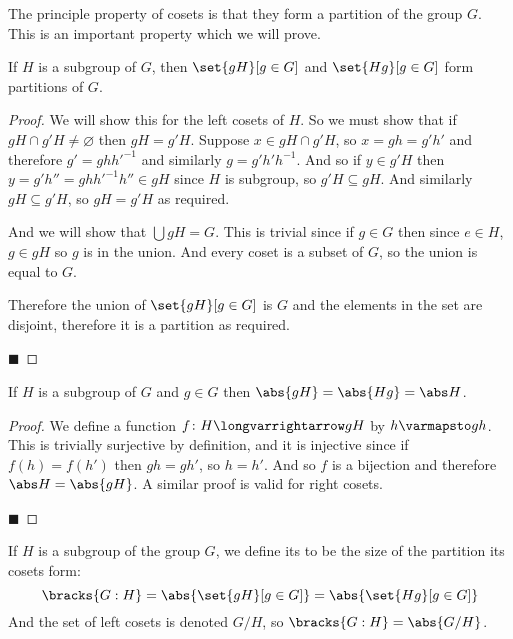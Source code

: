 The principle property of cosets is that they form a partition of the group $G$.
This is an important property which we will prove.

\begin{prop*}

    If $H$ is a subgroup of $G$, then $\set{gH}[g\in G]$ and $\set{Hg}[g\in G]$ form partitions of $G$.

\end{prop*}

\begin{proof}

    We will show this for the left cosets of $H$.
    So we must show that if $gH\cap g'H\neq\varnothing$ then $gH=g'H$.
    Suppose $x\in gH\cap g'H$, so $x=gh=g'h'$ and therefore $g'=ghh'^{-1}$ and similarly $g=g'h'h^{-1}$.
    And so if $y\in g'H$ then $y=g'h''=ghh'^{-1}h''\in gH$ since $H$ is subgroup, so $g'H\subseteq gH$.
    And similarly $gH\subseteq g'H$, so $gH=g'H$ as required.

    And we will show that $\bigcup gH=G$.
    This is trivial since if $g\in G$ then since $e\in H$, $g\in gH$ so $g$ is in the union.
    And every coset is a subset of $G$, so the union is equal to $G$.

    Therefore the union of $\set{gH}[g\in G]$ is $G$ and the elements in the set are disjoint, therefore it is a partition as required.

    \hfill$\blacksquare$

\end{proof}

\begin{lemm*}

    If $H$ is a subgroup of $G$ and $g\in G$ then $\abs{gH}=\abs{Hg}=\abs H$.

\end{lemm*}

\begin{proof}

    We define a function $f\colon H\longvarrightarrow gH$ by $h\varmapsto gh$.
    This is trivially surjective by definition, and it is injective since if $f(h)=f(h')$ then $gh=gh'$, so $h=h'$.
    And so $f$ is a bijection and therefore $\abs H=\abs{gH}$.
    A similar proof is valid for right cosets.

    \hfill$\blacksquare$

\end{proof}

\begin{defn*}

    If $H$ is a subgroup of the group $G$, we define its  to be the size of the partition its cosets form:
    \[ \bracks{G:H} = \abs{\set{gH}[g\in G]} = \abs{\set{Hg}[g\in G]} \]
    And the set of left cosets is denoted $G/H$, so $\bracks{G:H}=\abs{G/H}$.

\end{defn*}

